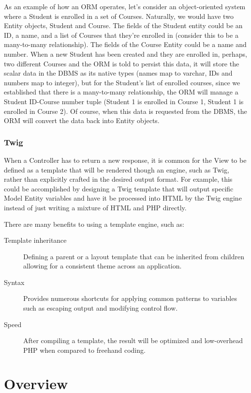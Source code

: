 \documentclass[letterpaper,12pt]{report}
\begin{document}
As an example of how an ORM operates, let's consider an object-oriented system where a Student is enrolled in a set of Courses. Naturally, we would have two Entity objects, Student and Course. The fields of the Student entity could be an ID, a name, and a list of Courses that they're enrolled in (consider this to be a many-to-many relationship). The fields of the Course Entity could be a name and number. When a new Student has been created and they are enrolled in, perhaps, two different Courses and the ORM is told to persist this data, it will store the scalar data in the  DBMS as its native types (names map to varchar, IDs and numbers map to integer), but for the Student's list of enrolled courses, since we established that there is a many-to-many relationship, the ORM will manage a Student ID-Course number tuple (Student 1 is enrolled in Course 1, Student 1 is enrolled in Course 2). Of course, when this data is requested from the DBMS, the ORM will convert the data back into Entity objects.

\subsubsection*{Twig}

When a Controller has to return a new response, it is common for the View to be defined as a template that will be rendered though an engine, such as Twig, rather than explicitly crafted in the desired output format. For example, this could be accomplished by designing a Twig template that will output specific Model Entity variables and have it be processed into HTML by the Twig engine instead of just writing a mixture of HTML and PHP directly.

There are many benefits to using a template engine, such as:

\begin{description}
	\item [Template inheritance] Defining a parent or a layout template that can be inherited from children allowing for a consistent theme across an application.
	\item [Syntax] Provides numerous shortcuts for applying common patterns to variables such as escaping output and modifying control flow.
	\item [Speed] After compiling a template, the result will be optimized and low-overhead PHP when compared to freehand coding.
\end{description}

\section*{Overview}
\end{document}
